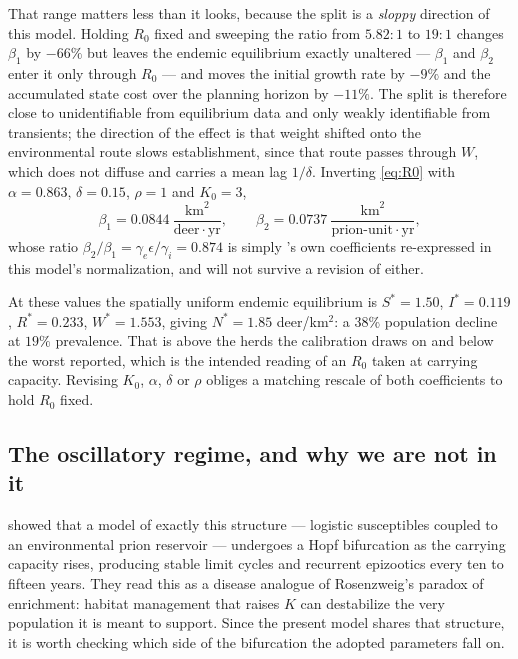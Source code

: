 \documentclass[11pt]{article}
\begin{document}
That range matters less than it looks, because the split is a \emph{sloppy} direction of this model. Holding $R_0$ fixed and sweeping the ratio from $5.82\!:\!1$ to $19\!:\!1$ changes $\beta_1$ by $-66\%$ but leaves the endemic equilibrium exactly unaltered --- $\beta_1$ and $\beta_2$ enter it only through $R_0$ --- and moves the initial growth rate by $-9\%$ and the accumulated state cost over the planning horizon by $-11\%$. The split is therefore close to unidentifiable from equilibrium data and only weakly identifiable from transients; the direction of the effect is that weight shifted onto the environmental route slows establishment, since that route passes through $W$, which does not diffuse and carries a mean lag $1/\delta$. Inverting \eqref{eq:R0} with $\alpha = 0.863$, $\delta = 0.15$, $\rho = 1$ and $K_0 = 3$,
\[
\beta_1 = 0.0844\ \frac{\mathrm{km}^2}{\text{deer}\cdot\mathrm{yr}},
\qquad
\beta_2 = 0.0737\ \frac{\mathrm{km}^2}{\text{prion-unit}\cdot\mathrm{yr}},
\]
whose ratio $\beta_2/\beta_1 = \gamma_e\epsilon/\gamma_i = 0.874$ is simply \citeauthor{Miller2006}'s own coefficients re-expressed in this model's normalization, and will not survive a revision of either.

At these values the spatially uniform endemic equilibrium is $S^\ast = 1.50$, $I^\ast = 0.119$, $R^\ast = 0.233$, $W^\ast = 1.553$, giving $N^\ast = 1.85$ deer/km$^2$: a $38\%$ population decline at $19\%$ prevalence. That is above the herds the calibration draws on and below the worst reported, which is the intended reading of an $R_0$ taken at carrying capacity. Revising $K_0$, $\alpha$, $\delta$ or $\rho$ obliges a matching rescale of both coefficients to hold $R_0$ fixed.

\subsection{The oscillatory regime, and why we are not in it}
\label{sec:params-hopf}

\citet{SharpPastor2011} showed that a model of exactly this structure --- logistic susceptibles coupled to an environmental prion reservoir --- undergoes a Hopf bifurcation as the carrying capacity rises, producing stable limit cycles and recurrent epizootics every ten to fifteen years. They read this as a disease analogue of Rosenzweig's paradox of enrichment: habitat management that raises $K$ can destabilize the very population it is meant to support. Since the present model shares that structure, it is worth checking which side of the bifurcation the adopted parameters fall on.
\end{document}

